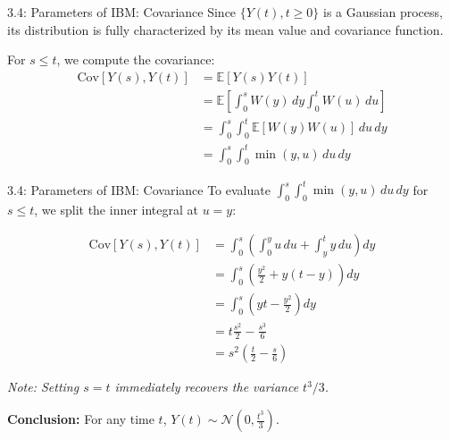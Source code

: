 \documentclass{beamer}
\begin{document}
	\begin{frame}{3.4: Parameters of IBM: Covariance}
		Since $\{Y(t), t \ge 0\}$ is a Gaussian process, its distribution is fully characterized by its mean value and covariance function. 
		
		\vspace{0.3cm}
		For $s \le t$, we compute the covariance:
		\begin{align*}
			\text{Cov}[Y(s), Y(t)] &= \mathbb{E}[Y(s)Y(t)] \\
			&= \mathbb{E}\left[ \int_0^s W(y) \, dy \int_0^t W(u) \, du \right] \\
			&= \int_0^s \int_0^t \mathbb{E}[W(y)W(u)] \, du \, dy \\
			&= \int_0^s \int_0^t \min(y, u) \, du \, dy
		\end{align*}
	\end{frame}
	
	\begin{frame}{3.4: Parameters of IBM: Covariance}
		To evaluate $\int_0^s \int_0^t \min(y, u) \, du \, dy$ for $s \le t$, we split the inner integral at $u=y$:
		
		\begin{align*}
			\text{Cov}[Y(s), Y(t)] &= \int_0^s \left( \int_0^y u \, du + \int_y^t y \, du \right) dy \\
			&= \int_0^s \left( \frac{y^2}{2} + y(t - y) \right) dy \\
			&= \int_0^s \left( yt - \frac{y^2}{2} \right) dy \\
			&= t\frac{s^2}{2} - \frac{s^3}{6} \\
			&= s^2 \left( \frac{t}{2} - \frac{s}{6} \right)
		\end{align*}
		
		\vspace{0.2cm}
		\textit{Note: Setting $s=t$ immediately recovers the variance $t^3/3$.}
		
		\vspace{0.2cm}
		\textbf{Conclusion:} For any time $t$, $Y(t) \sim \mathcal{N}\left(0, \frac{t^3}{3}\right)$.
	\end{frame}
	
\end{document}
